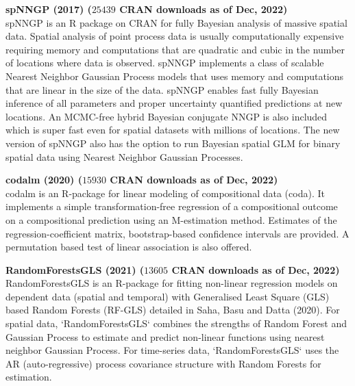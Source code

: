\documentclass[12pt]{article}
\begin{document}
\item 
{\bf spNNGP (2017) ($25439$ CRAN downloads as of Dec, 2022)} \\%
spNNGP is an R package on CRAN for fully Bayesian analysis of massive spatial data. Spatial analysis of point process data is usually computationally expensive requiring memory and computations that are quadratic and cubic in the number of locations where data is observed. spNNGP implements a class of scalable Nearest Neighbor Gaussian Process models that uses memory and computations that are linear in the size of the data. spNNGP enables fast fully Bayesian inference of all parameters and proper uncertainty quantified predictions at new locations. An MCMC-free hybrid Bayesian conjugate NNGP is also included which is super fast even for spatial datasets with millions of locations. The new version of spNNGP also has the option to run Bayesian spatial GLM for binary spatial data using Nearest Neighbor Gaussian Processes. 

\item 
{\bf codalm (2020) ($15930$ CRAN downloads as of Dec, 2022)} \\%
codalm is an R-package for linear modeling of compositional data (coda). It implements a simple  transformation-free regression of a compositional outcome on a compositional prediction using an M-estimation method. Estimates of the regression-coefficient matrix, bootstrap-based confidence intervals are provided. A permutation based test of linear association is also offered.

\item
{\bf RandomForestsGLS (2021) ($13605$ CRAN downloads as of Dec, 2022)} \\
RandomForestsGLS is an R-package for fitting non-linear regression models on dependent data (spatial and temporal) with Generalised Least Square (GLS) based Random Forests (RF-GLS) detailed in Saha, Basu and Datta (2020). For spatial data, `RandomForestsGLS` combines the strengths of Random Forest and Gaussian Process to estimate and predict non-linear functions using nearest neighbor Gaussian Process. For time-series data, `RandomForestsGLS` uses the AR (auto-regressive) process covariance structure with Random Forests for estimation. 
\end{document}
